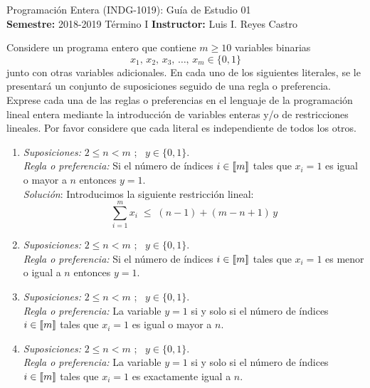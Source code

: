 \documentclass[ a4paper, twoside, 11pt]{article}
\newcommand{\numero}{01}
\begin{document}
\allowdisplaybreaks



\begin{center}
\Large Programaci\'on Entera (INDG-1019): Gu\'ia de Estudio \numero \\[1ex]
\small \textbf{Semestre:} 2018-2019 T\'ermino I \qquad
\textbf{Instructor:} Luis I. Reyes Castro
\end{center}
\fullskip

\begin{problem}
Considere un programa entero que contiene $m \geq 10$ variables binarias
\[
x_1, \, x_2, \, x_3, \, \dots, \, x_m \in \{ 0, 1 \}
\]
junto con otras variables adicionales. En cada uno de los siguientes literales, se le presentar\'a un conjunto de suposiciones seguido de una regla o preferencia. Exprese cada una de las reglas o preferencias en el lenguaje de la programaci\'on lineal entera mediante la introducci\'on de variables enteras y/o de restricciones lineales. Por favor considere que cada literal es independiente de todos los otros. 
\begin{enumerate}[label=\alph*)]
\item \emph{Suposiciones:} $2 \leq n < m$ ; \, $y \in \{ 0, 1\}$. \\
\emph{Regla o preferencia:} Si el n\'umero de \'indices $i \in \llbracket m \rrbracket$ tales que $x_i = 1$ es igual o mayor a $n$ entonces $y = 1$. \\[1ex]
\emph{Soluci\'on}: Introducimos la siguiente restricci\'on lineal: 
\[
\sum_{i=1}^m x_i \; \leq \; (n-1) + (m-n+1) \, y
\]

\item \emph{Suposiciones:} $2 \leq n < m$ ; \, $y \in \{ 0, 1\}$. \\
\emph{Regla o preferencia:} Si el n\'umero de \'indices $i \in \llbracket m \rrbracket$ tales que $x_i = 1$ es menor o igual a $n$ entonces $y = 1$. 

\item \emph{Suposiciones:} $2 \leq n < m$ ; \, $y \in \{ 0, 1\}$. \\
\emph{Regla o preferencia:} La variable $y = 1$ si y solo si el n\'umero de \'indices $i \in \llbracket m \rrbracket$ tales que $x_i = 1$ es igual o mayor a $n$. 

\item \emph{Suposiciones:} $2 \leq n < m$ ; \, $y \in \{ 0, 1\}$. \\
\emph{Regla o preferencia:} La variable $y = 1$ si y solo si el n\'umero de \'indices $i \in \llbracket m \rrbracket$ tales que $x_i = 1$ es exactamente igual a $n$. 


\end{enumerate}
\end{problem}
\end{document}
